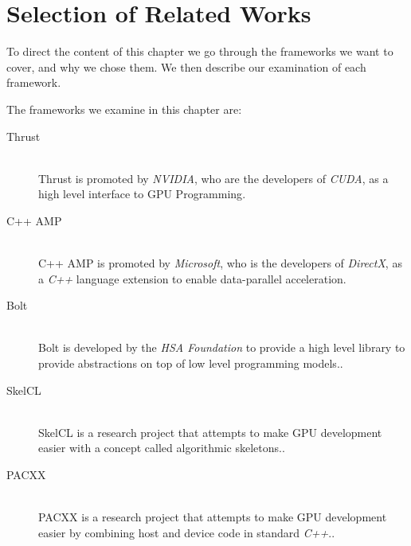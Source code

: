 \section{Selection of Related Works}


To direct the content of this chapter we go through the frameworks we want to cover, and why we chose them. We then describe our examination of each framework.

The frameworks we examine in this chapter are:
\begin{description}
\item[Thrust] \hfill \\
Thrust is promoted by \textit{NVIDIA}, who are the developers of \textit{CUDA}, as a high level interface to GPU Programming\cite{thrustNvidia}.
\item[C++ AMP] \hfill \\
C++ AMP is promoted by \textit{Microsoft}, who is the developers of \textit{DirectX}, as a \textit{C++} language extension to enable data-parallel acceleration\cite{microsoftCppAMP}.
\item[Bolt] \hfill \\
Bolt is developed by the \textit{HSA Foundation} to provide a high level library to provide abstractions on top of low level programming models.\cite{boltDoc}.
\item[SkelCL] \hfill \\
SkelCL is a research project that attempts to make GPU development easier with a concept called algorithmic skeletons.\cite{skelclPaper}.
\item[PACXX] \hfill \\
PACXX is a research project that attempts to make GPU development easier by combining host and device code in standard \textit{C++}.\cite{pacxxPaper}.
\end{description}

